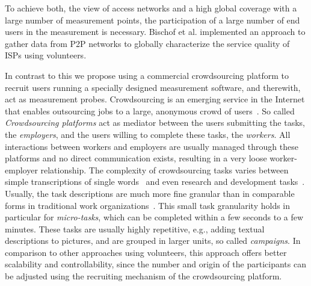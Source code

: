 To achieve both, the view of access networks and a high global coverage with a large number of measurement points, the participation of a large number of end users in the measurement is necessary.
Bischof et al. \cite{bischof2011crowdsourcing} implemented an approach to gather data from P2P networks to globally characterize the service quality of ISPs using volunteers.

In contrast to this we propose using a commercial crowdsourcing platform to recruit users running a specially designed measurement software, and therewith, act as measurement probes.
Crowdsourcing is an emerging service in the Internet that enables outsourcing jobs to a large, anonymous crowd of users~\cite{articles2013-113}.
So called \emph{Crowdsourcing platforms} act as mediator between the users submitting the tasks, the \emph{employers}, and the users willing to complete these tasks, the \emph{workers}.
All interactions between workers and employers are usually managed through these platforms and no direct communication exists, resulting in a very loose worker-employer relationship.
The complexity of crowdsourcing tasks varies between simple transcriptions of single words~\cite{vonAhn2008} and even research and development tasks~\cite{innocentive}.
Usually, the task descriptions are much more fine granular than in comparable forms in traditional work organizations~\cite{conf2011-417}.
This small task granularity holds in particular for \emph{micro-tasks}, which can be completed within a few seconds to a few minutes.
These tasks are usually highly repetitive, e.g., adding textual descriptions to pictures, and are grouped in larger units, so called \emph{campaigns}.
In comparison to other approaches using volunteers, this approach offers better scalability and controllability, since the number and origin of the participants can be adjusted using the recruiting mechanism of the crowdsourcing platform.
